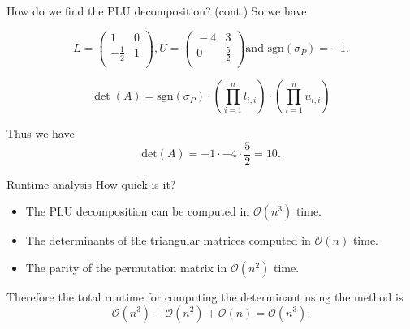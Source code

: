 \documentclass{beamer}
\begin{document}
\begin{frame}{How do we find the PLU decomposition? (cont.)}
    So we have

    \[L=\begin{pmatrix}{}
            1 & 0 \\
            -\frac{1}{2} & 1 \\
            \end{pmatrix}, U=\begin{pmatrix}{}
            -4 & 3 \\
            0 & \frac{5}{2} \\
    \end{pmatrix} \text{and sgn} (\sigma_P)=-1.
    \]
    
    
    
     \begin{block}{}
        \[
            \det(A) = \text{sgn}(\sigma_P) \cdot \left( \prod_{i=1}^{n} l_{i,i} \right) \cdot
            \left( \prod_{i=1}^{n} u_{i,i} \right)
        \]
    \end{block}
    
    
    
    \pause
    
    
    
    
    Thus we have
    \[
        \text{det}(A)
        =-1\cdot-4\cdot\frac{5}{2}=10.
    \]

\end{frame}


\begin{frame}{Runtime analysis}
    How quick is it?
    \begin{itemize}
        \item The PLU decomposition can be computed in $\mathcal{O}(n^3)$ time.
        \item The determinants of the triangular matrices computed in $\mathcal{O}(n)$ time.
        \item The parity of the permutation matrix in $\mathcal{O}(n^2)$ time.
    \end{itemize}

    Therefore the total runtime for computing the determinant using the method is
    \[
        \mathcal{O}(n^3) + \mathcal{O}(n^2) + \mathcal{O}(n) = \mathcal{O}(n^3).
    \]

\end{frame}
\end{document}
